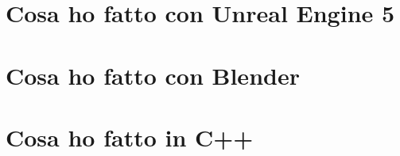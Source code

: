 \section{Cosa ho fatto con Unreal Engine 5}

\section{Cosa ho fatto con Blender}

\section{Cosa ho fatto in C++}